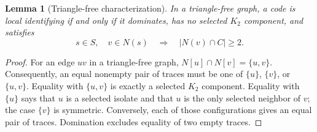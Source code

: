 \documentclass[11pt]{article}
\newtheorem{lemma}[theorem]{Lemma}
\theoremstyle{definition}\newtheorem{definition}[theorem]{Definition}
\theoremstyle{remark}\newtheorem{remark}[theorem]{Remark}
\newcommand{\card}[1]{\lvert #1\rvert}
\begin{document}
\begin{lemma}[Triangle-free characterization]\label{lem:characterization}
In a triangle-free graph, a code is local identifying if and only if it dominates, has no selected $K_2$ component, and satisfies
\begin{equation}\label{eq:isoneighbor}
 s\in S,\quad v\in N(s)\quad\Longrightarrow\quad\card{N(v)\cap C}\ge2.
\end{equation}
\end{lemma}
\begin{proof}
For an edge $uv$ in a triangle-free graph, $N[u]\cap N[v]=\{u,v\}$. Consequently, an equal nonempty pair of traces must be one of $\{u\}$, $\{v\}$, or $\{u,v\}$. Equality with $\{u,v\}$ is exactly a selected $K_2$ component. Equality with $\{u\}$ says that $u$ is a selected isolate and that $u$ is the only selected neighbor of $v$; the case $\{v\}$ is symmetric. Conversely, each of those configurations gives an equal pair of traces. Domination excludes equality of two empty traces.
\end{proof}
\end{document}
